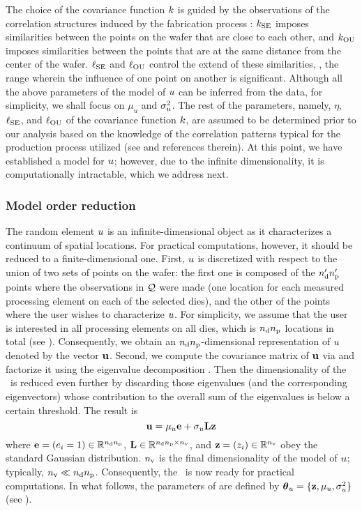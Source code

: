 The choice of the covariance function $\fCov$ is guided by the observations of the correlation structures induced by the fabrication process \cite{chandrakasan2001, cheng2011}: $\fCov_\SE$ imposes similarities between the points on the wafer that are close to each other, and $\fCov_\OU$ imposes similarities between the points that are at the same distance from the center of the wafer.
$\ell_{\text{SE}}$ and $\ell_{\text{OU}}$ control the extend of these similarities, \ie, the range wherein the influence of one point on another is significant.
Although all the above parameters of the model of $u$ can be inferred from the data, for simplicity, we shall focus on $\mu_u$ and $\sigma_u^2$.
The rest of the parameters, namely, $\eta$, $\ell_{\text{SE}}$, and $\ell_{\text{OU}}$ of the covariance function $\fCov$, are assumed to be determined prior to our analysis based on the knowledge of the correlation patterns typical for the production process utilized (see \cite{marzouk2009} and references therein).
At this point, we have established a model for $u$; however, due to the infinite dimensionality, it is computationally intractable, which we address next.


\subsubsection{Model order reduction} 
The random element $u$ is an infinite-dimensional object as it characterizes a continuum of spatial locations.
For practical computations, however, it should be reduced to a finite-dimensional one.
First, $u$ is discretized with respect to the union of two sets of points on the wafer: the first one is composed of the ${n_\text{d}'} {n_\text{p}'}$ points where the observations in $\mathcal{Q}$ were made (one location for each measured processing element on each of the selected dies), and the other of the points where the user wishes to characterize $u$.
For simplicity, we assume that the user is interested in all processing elements on all dies, which is ${n_\text{d}} {n_\text{p}}$ locations in total (see ). Consequently, we obtain an ${n_\text{d}} {n_\text{p}}$-dimensional representation of $u$ denoted by the vector $\mathbf{u}$.
Second, we compute the covariance matrix of $\mathbf{u}$ via  and factorize it using the eigenvalue decomposition \cite{press2007}.
Then the dimensionality of the \qoi\ is reduced even further by discarding those eigenvalues (and the corresponding eigenvectors) whose contribution to the overall sum of the eigenvalues is below a certain threshold.
The result is
\begin{equation} \elabel{kl-approximation}
  \vu = \mu_\u \vI + \sigma_\u \mKL \vz
\end{equation}
where $\mathbf{e} = (e_i = 1) \in \mathbb{R}^{{n_\text{d}} {n_\text{p}}}$, $\mathbf{L} \in \mathbb{R}^{{n_\text{d}} {n_\text{p}} \times {n_\text{v}}}$, and $\mathbf{z} = (z_i) \in \mathbb{R}^{n_\text{v}}$ obey the standard Gaussian distribution.
${n_\text{v}}$ is the final dimensionality of the model of $u$; typically, ${n_\text{v}} \ll {n_\text{d}} {n_\text{p}}$.
Consequently, the \qoi\ is now ready for practical computations.
In what follows, the parameters of  are defined by ${\boldsymbol\theta}_u = \{ \mathbf{z}, \mu_u, \sigma^2_u \}$ (see ).


